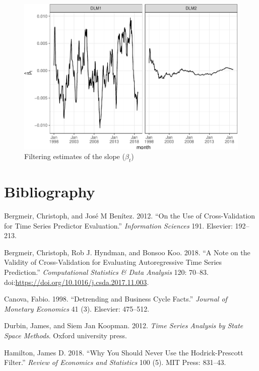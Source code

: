 \documentclass[]{article}
\begin{document}
\begin{figure}
\centering
\includegraphics{../figs/freq--trend-growth-1.pdf}
\caption{\label{fig:trend-growth}Filtering estimates of the slope
(\(\beta_t\))}
\end{figure}

\section*{Bibliography}\label{bibliography}

\hypertarget{refs}{}
\hypertarget{ref-bergmeir2012use}{}
Bergmeir, Christoph, and José M Benítez. 2012. ``On the Use of
Cross-Validation for Time Series Predictor Evaluation.''
\emph{Information Sciences} 191. Elsevier: 192--213.

\hypertarget{ref-bergmeir2018}{}
Bergmeir, Christoph, Rob J. Hyndman, and Bonsoo Koo. 2018. ``A Note on
the Validity of Cross-Validation for Evaluating Autoregressive Time
Series Prediction.'' \emph{Computational Statistics \& Data Analysis}
120: 70--83.
doi:\href{https://doi.org/https://doi.org/10.1016/j.csda.2017.11.003}{https://doi.org/10.1016/j.csda.2017.11.003}.

\hypertarget{ref-canova1998detrending}{}
Canova, Fabio. 1998. ``Detrending and Business Cycle Facts.''
\emph{Journal of Monetary Economics} 41 (3). Elsevier: 475--512.

\hypertarget{ref-durbin2012time}{}
Durbin, James, and Siem Jan Koopman. 2012. \emph{Time Series Analysis by
State Space Methods}. Oxford university press.

\hypertarget{ref-hamilton2018}{}
Hamilton, James D. 2018. ``Why You Should Never Use the Hodrick-Prescott
Filter.'' \emph{Review of Economics and Statistics} 100 (5). MIT Press:
831--43.
\end{document}
